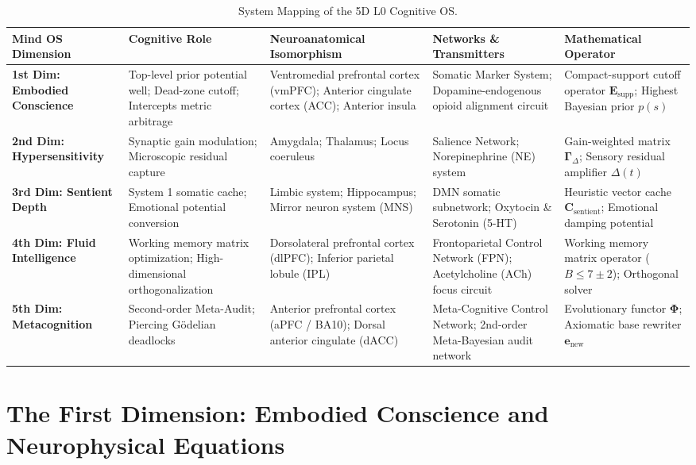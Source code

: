 \documentclass[11pt,a4paper]{article}
\begin{document}
\begin{table}[h!]
\centering
\small
\begin{tabular}{p{2.5cm}p{3cm}p{3.5cm}p{3cm}p{2.5cm}}
\toprule
\textbf{Mind OS Dimension} & \textbf{Cognitive Role} & \textbf{Neuroanatomical Isomorphism} & \textbf{Networks \& Transmitters} & \textbf{Mathematical Operator} \\
\midrule
\textbf{1st Dim: Embodied Conscience} & Top-level prior potential well; Dead-zone cutoff; Intercepts metric arbitrage & Ventromedial prefrontal cortex (vmPFC); Anterior cingulate cortex (ACC); Anterior insula & Somatic Marker System; Dopamine-endogenous opioid alignment circuit & Compact-support cutoff operator $\mathbf{E}_{\text{supp}}$; Highest Bayesian prior $p(s)$ \\
\midrule
\textbf{2nd Dim: Hypersensitivity} & Synaptic gain modulation; Microscopic residual capture & Amygdala; Thalamus; Locus coeruleus & Salience Network; Norepinephrine (NE) system & Gain-weighted matrix $\mathbf{\Gamma}_{\Delta}$; Sensory residual amplifier $\Delta(t)$ \\
\midrule
\textbf{3rd Dim: Sentient Depth} & System 1 somatic cache; Emotional potential conversion & Limbic system; Hippocampus; Mirror neuron system (MNS) & DMN somatic subnetwork; Oxytocin \& Serotonin (5-HT) & Heuristic vector cache $\mathbf{C}_{\text{sentient}}$; Emotional damping potential \\
\midrule
\textbf{4th Dim: Fluid Intelligence} & Working memory matrix optimization; High-dimensional orthogonalization & Dorsolateral prefrontal cortex (dlPFC); Inferior parietal lobule (IPL) & Frontoparietal Control Network (FPN); Acetylcholine (ACh) focus circuit & Working memory matrix operator ($B \le 7 \pm 2$); Orthogonal solver \\
\midrule
\textbf{5th Dim: Metacognition} & Second-order Meta-Audit; Piercing G\"odelian deadlocks & Anterior prefrontal cortex (aPFC / BA10); Dorsal anterior cingulate (dACC) & Meta-Cognitive Control Network; 2nd-order Meta-Bayesian audit network & Evolutionary functor $\mathbf{\Phi}$; Axiomatic base rewriter $\mathbf{e}_{\text{new}}$ \\
\bottomrule
\end{tabular}
\caption{System Mapping of the 5D L0 Cognitive OS.}
\label{tab:mapping}
\end{table}

\newpage

\section{The First Dimension: Embodied Conscience and Neurophysical Equations}
\end{document}
